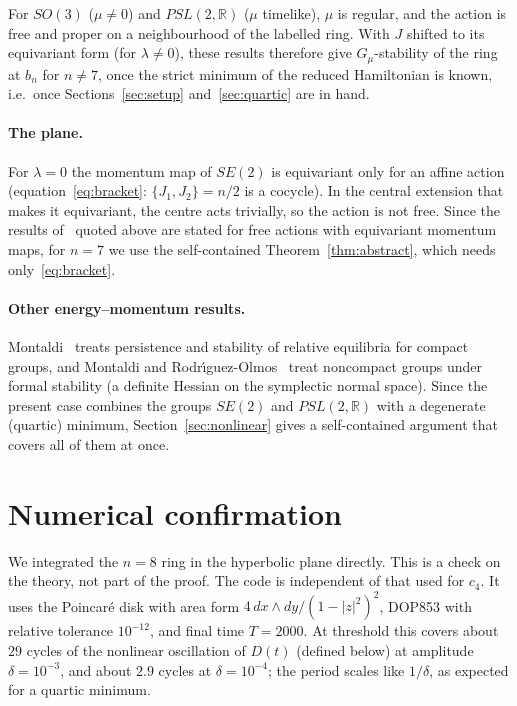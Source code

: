 \documentclass[11pt]{article}
\theoremstyle{definition}
\theoremstyle{remark}
\newcommand{\R}{\mathbb{R}}
\begin{document}
For $SO(3)$ ($\mu\ne0$) and $PSL(2,\R)$ ($\mu$ timelike), $\mu$ is regular, and the action is free and
proper on a neighbourhood of the labelled ring. With $J$ shifted to its equivariant form (for
$\lambda\ne0$), these results therefore give $G_\mu$-stability of the ring at $b_n$ for $n\ne7$, once the
strict minimum of the reduced Hamiltonian is known, i.e.\ once Sections~\ref{sec:setup}
and~\ref{sec:quartic} are in hand.

\paragraph{The plane.} For $\lambda=0$ the momentum map of $SE(2)$ is equivariant only for an affine
action (equation~\eqref{eq:bracket}: $\{J_1,J_2\}=n/2$ is a cocycle). In the central extension that makes
it equivariant, the centre acts trivially, so the action is not free. Since the results of~\cite{PRW}
quoted above are stated for free actions with equivariant momentum maps, for $n=7$ we use the
self-contained Theorem~\ref{thm:abstract}, which needs only~\eqref{eq:bracket}.

\paragraph{Other energy--momentum results.} Montaldi~\cite{Montaldi97} treats persistence and stability
of relative equilibria for compact groups, and Montaldi and Rodr\'\i guez-Olmos~\cite{MRO} treat
noncompact groups under formal stability (a definite Hessian on the symplectic normal space). Since the
present case combines the groups $SE(2)$ and $PSL(2,\R)$ with a degenerate (quartic) minimum,
Section~\ref{sec:nonlinear} gives a self-contained argument that covers all of them at once.

\section{Numerical confirmation}\label{sec:numerics}

We integrated the $n=8$ ring in the hyperbolic plane directly. This is a check on the theory, not part of
the proof. The code is independent of that used for $c_4$. It uses the Poincar\'e disk with area form
$4\,dx\wedge dy/(1-|z|^2)^2$, DOP853 with relative tolerance $10^{-12}$, and final time $T=2000$. At
threshold this covers about $29$ cycles of the nonlinear oscillation of $D(t)$ (defined below) at
amplitude $\delta=10^{-3}$, and about $2.9$ cycles at $\delta=10^{-4}$; the period scales like $1/\delta$, as
expected for a quartic minimum.
\end{document}
